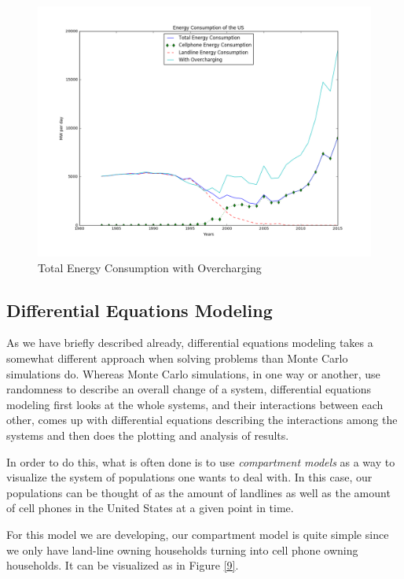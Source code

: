 \documentclass{article}
\begin{document}
\begin{figure}
    \centering
    \includegraphics[width=\textwidth]{Overcharging.png} 
    \caption{Total Energy Consumption with Overcharging}
    \label{overcharging}
\end{figure}


\subsection{Differential Equations Modeling}
As we have briefly described already, differential equations modeling takes a somewhat different approach when solving problems than Monte Carlo simulations do. Whereas Monte Carlo simulations, in one way or another, use randomness to describe an overall change of a system, differential equations modeling first looks at the whole systems, and their interactions between each other, comes up with differential equations describing the interactions among the systems and then does the plotting and analysis of results.\par 
In order to do this, what is often done is to use \textit{compartment models} as a way to visualize the system of populations one wants to deal with. In this case, our populations can be thought of as the amount of landlines as well as the amount of cell phones in the United States at a given point in time.\par 

For this model we are developing, our compartment model is quite simple since we only have land-line owning households turning into cell phone owning households.
It can be visualized as in Figure \ref{9}.
\end{document}
